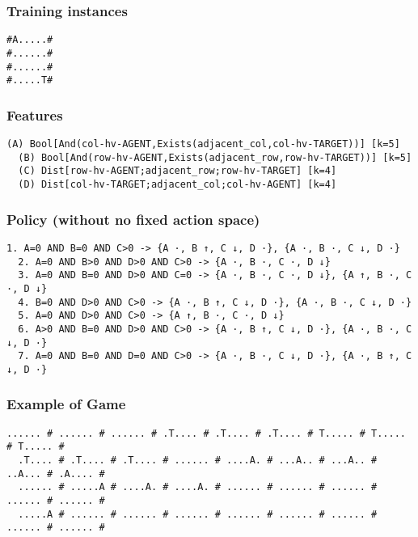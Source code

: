 \documentclass[a4paper]{article}
\begin{document}
\subsubsection{Training instances}
\begin{Verbatim}[fontsize=\footnotesize]
#A.....#
#......#
#......#
#.....T#
\end{Verbatim}

\subsubsection{Features}
\begin{Verbatim}[fontsize=\footnotesize]
  (A) Bool[And(col-hv-AGENT,Exists(adjacent_col,col-hv-TARGET))] [k=5]
  (B) Bool[And(row-hv-AGENT,Exists(adjacent_row,row-hv-TARGET))] [k=5]
  (C) Dist[row-hv-AGENT;adjacent_row;row-hv-TARGET] [k=4]
  (D) Dist[col-hv-TARGET;adjacent_col;col-hv-AGENT] [k=4]
\end{Verbatim}

\subsubsection{Policy (without no fixed action space)}
\begin{Verbatim}[fontsize=\footnotesize]
  1. A=0 AND B=0 AND C>0 -> {A ·, B ↑, C ↓, D ·}, {A ·, B ·, C ↓, D ·}
  2. A=0 AND B>0 AND D>0 AND C>0 -> {A ·, B ·, C ·, D ↓}
  3. A=0 AND B=0 AND D>0 AND C=0 -> {A ·, B ·, C ·, D ↓}, {A ↑, B ·, C ·, D ↓}
  4. B=0 AND D>0 AND C>0 -> {A ·, B ↑, C ↓, D ·}, {A ·, B ·, C ↓, D ·}
  5. A=0 AND D>0 AND C>0 -> {A ↑, B ·, C ·, D ↓}
  6. A>0 AND B=0 AND D>0 AND C>0 -> {A ·, B ↑, C ↓, D ·}, {A ·, B ·, C ↓, D ·}
  7. A=0 AND B=0 AND D=0 AND C>0 -> {A ·, B ·, C ↓, D ·}, {A ·, B ↑, C ↓, D ·}

\end{Verbatim}

\subsubsection{Example of Game}
\begin{Verbatim}[fontsize=\footnotesize]
  ...... # ...... # ...... # .T.... # .T.... # .T.... # T..... # T..... # T..... #
  .T.... # .T.... # .T.... # ...... # ....A. # ...A.. # ...A.. # ..A... # .A.... #
  ...... # .....A # ....A. # ....A. # ...... # ...... # ...... # ...... # ...... #
  .....A # ...... # ...... # ...... # ...... # ...... # ...... # ...... # ...... #
\end{Verbatim}
\end{document}
